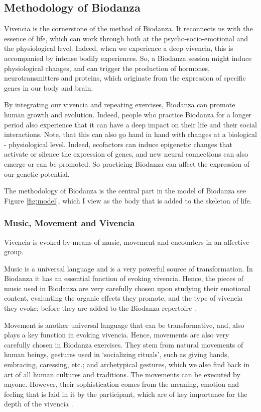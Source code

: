\documentclass[
  11pt,
]{book}
\begin{document}
\hypertarget{methodology-of-biodanza}{%
\subsection{Methodology of Biodanza}\label{methodology-of-biodanza}}

Vivencia is the cornerstone of the method of Biodanza. It reconnects us with the essence of life, which can work through both at the psycho-socio-emotional and the physiological level. Indeed, when we experience a deep vivencia, this is accompanied by intense bodily experiences. So, a Biodanza session might induce physiological changes, and can trigger the production of hormones, neurotransmitters and proteins, which originate from the expression of specific genes in our body and brain.

By integrating our vivencia and repeating exercises, Biodanza can promote human growth and evolution. Indeed, people who practice Biodanza for a longer period also experience that it can have a deep impact on their life and their social interactions. Note, that this can also go hand in hand with changes at a biological - physiological level. Indeed, ecofactors can induce epigenetic changes that activate or silence the expression of genes, and new neural connections can also emerge or can be promoted. So practicing Biodanza can affect the expression of our genetic potential.

The methodology of Biodanza is the central part in the model of Biodanza see Figure \ref{fig:model}, which I view as the body that is added to the skeleton of life.

\hypertarget{music-movement-and-vivencia}{%
\subsubsection{Music, Movement and Vivencia}\label{music-movement-and-vivencia}}

Vivencia is evoked by means of music, movement and encounters in an affective group.

Music is a universal language and is a very powerful source of transformation. In Biodanza it has an essential function of evoking vivencia. Hence, the pieces of music used in Biodanza are very carefully chosen upon studying their emotional content, evaluating the organic effects they promote, and the type of vivencia they evoke; before they are added to the Biodanza repertoire \citep{toro2008}.

Movement is another universal language that can be transformative, and, also plays a key function in evoking vivencia. Hence, movements are also very carefully chosen in Biodanza exercises. They stem from natural movements of human beings, gestures used in `socializing rituals', such as giving hands, embracing, caressing, etc.; and archetypical gestures, which we also find back in art of all human cultures and traditions. The movements can be executed by anyone. However, their sophistication comes from the meaning, emotion and feeling that is laid in it by the participant, which are of key importance for the depth of the vivencia \citep{toro2008}.
\end{document}
